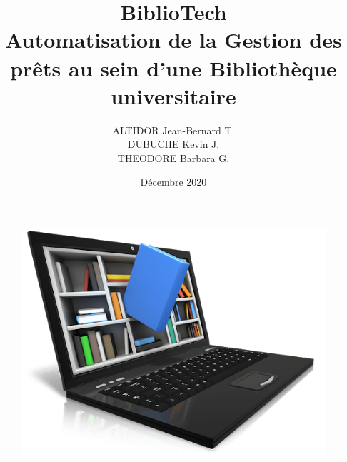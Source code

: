 \documentclass[a4paper,12pt]{report}
\begin{document}
\begin{figure}[!tbp]
    \centering
    \hfill
\end{figure}

\begin{figure}[h]
    \centering
    \includegraphics[width=1\textwidth]{lib}
    \label{image-lib}
\end{figure}


\title{BiblioTech \\ Automatisation de la Gestion des prêts au sein d'une Bibliothèque universitaire}
\author{ALTIDOR Jean-Bernard T. \\ DUBUCHE Kevin J. \\ THEODORE Barbara G.}
\date{Décembre 2020}
\maketitle
\end{document}
